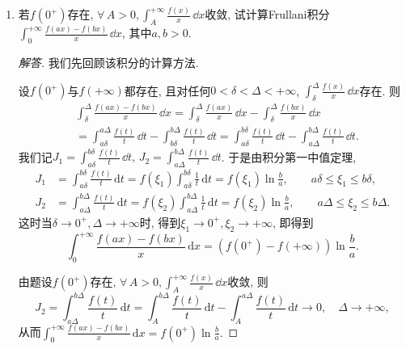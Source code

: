 \begin{a}
\begin{enumerate}
\begin{proof}
\end{proof}
\item 若\(f(0^+)\)存在, \(\forall\,A>0,\int_{A}^{+\infty}\frac{f(x)}{x}\,\dd x\)收敛, 
试计算Frullani积分\(\int_{0}^{+\infty}\frac{f(ax)-f(bx)}{x}\,\dd x\), 其中\(a,b>0\).
\begin{proof}[解答]
我们先回顾该积分的计算方法.

设\(f(0^+)\)与\(f(+\infty)\)都存在, 且对任何\(0<\delta<\varDelta<+\infty\), 
\(\int_{\delta}^{\varDelta}\frac{f(x)}{x}\,\dd x\)存在. 则
\[\begin{split}
&\int_{\delta}^{\varDelta}\frac{f(ax)-f(bx)}{x}\,\dd x
=\int_{\delta}^{\varDelta}\frac{f(ax)}{x}\,\dd x-\int_{\delta}^{\varDelta}\frac{f(bx)}{x}\,\dd x\\
&=\int_{a\delta}^{a\varDelta}\frac{f(t)}{t}\,\dd t-\int_{b\delta}^{b\varDelta}\frac{f(t)}{t}\,\dd t
=\int_{a\delta}^{b\delta}\frac{f(t)}{t}\,\dd t-\int_{a\varDelta}^{b\varDelta}\frac{f(t)}{t}\,\dd t.
\end{split}\]
我们记\(J_1=\int_{a\delta}^{b\delta}\frac{f(t)}{t}\,\dd t,\,J_2=\int_{a\varDelta}^{b\varDelta}\frac{f(t)}{t}\,\dd t\). 
于是由积分第一中值定理,
\[\begin{split}
J_1&=\int_{a\delta}^{b\delta}\frac{f(t)}{t}\,\mathrm{d}t
=f(\xi_1)\int_{a\delta}^{b\delta}\frac{1}{t}\,\mathrm{d}t
=f(\xi_1)\ln\frac{b}{a},\qquad a\delta\leqslant\xi_1\leqslant b\delta,\\
J_2&=\int_{a\varDelta}^{b\varDelta}\frac{f(t)}{t}\,\mathrm{d}t
=f(\xi_2)\int_{a\varDelta}^{b\varDelta}\frac{1}{t}\,\mathrm{d}t
=f(\xi_2)\ln\frac{b}{a},\qquad a\varDelta\leqslant\xi_2\leqslant b\varDelta.
\end{split}\]这时当\(\delta\rightarrow 0^+,\varDelta\rightarrow+\infty\)时, 
得到\(\xi_1\rightarrow 0^+,\xi_2\rightarrow+\infty\), 即得到
\[\int_0^{+\infty}\frac{f(ax)-f(bx)}{x}\,\mathrm{d}x
=\left(f(0^+)-f(+\infty)\right)\ln\frac{b}{a}.\]

由题设\(f(0^+)\)存在, \(\forall\,A>0,\int_{A}^{+\infty}\frac{f(x)}{x}\,\dd x\)收敛, 则
\[J_2=\int_{a\varDelta}^{b\varDelta}\frac{f(t)}{t}\,\mathrm{d}t
=\int_{A}^{b\varDelta}\frac{f(t)}{t}\,\mathrm{d}t-\int_{A}^{a\varDelta}\frac{f(t)}{t}\,\mathrm{d}t\rightarrow 0,\quad\varDelta\rightarrow+\infty,\]
从而\(\int_0^{+\infty}\frac{f(ax)-f(bx)}{x}\,\mathrm{d}x=f(0^+)\ln\frac{b}{a}.\)


\end{proof}
\end{enumerate}
\end{a}

